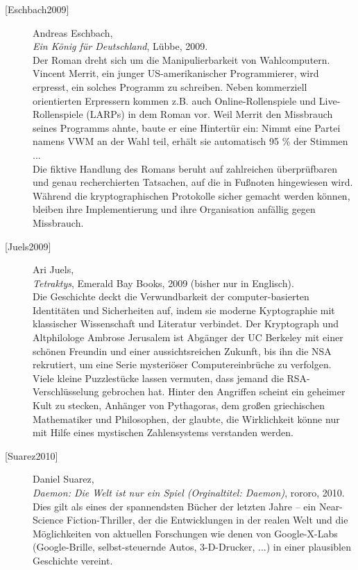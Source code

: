 \begin{refsegment}
\begin{description}
\item[\textrm{[Eschbach2009]}] 
    Andreas Eschbach,\\
    {\em Ein König für Deutschland}, Lübbe, 2009.\\
    Der Roman dreht sich um die Manipulierbarkeit von Wahlcomputern.\\
    Vincent Merrit, ein junger US-amerikanischer Programmierer, wird erpresst,
    ein solches Programm zu schreiben. Neben kommerziell orientierten Erpressern
    kommen z.B. auch Online-Rollenspiele und Live-Rollenspiele (LARPs) in dem Roman vor.
    Weil Merrit den Missbrauch seines Programms ahnte, baute er eine Hintertür
    ein: Nimmt eine Partei namens VWM an der Wahl teil, erhält sie automatisch
    95 \% der Stimmen ...\\
    Die fiktive Handlung des Romans beruht auf zahlreichen überprüfbaren und
    genau recherchierten Tatsachen, auf die in Fußnoten hingewiesen wird.\\
    Während die kryptographischen Protokolle sicher gemacht werden können,
    bleiben ihre Implementierung und ihre Organisation anfällig gegen Missbrauch.\\


\item[\textrm{[Juels2009]}] 
    Ari Juels,\\
    {\em Tetraktys}, Emerald Bay Books, 2009 (bisher nur in Englisch).\\
    Die Geschichte deckt die Verwundbarkeit der computer-basierten Identitäten und
    Sicherheiten auf, indem sie moderne Kyptographie mit klassischer Wissenschaft und
    Literatur verbindet.
    Der Kryptograph und Altphilologe Ambrose Jerusalem ist Abgänger der UC Berkeley
    mit einer schönen Freundin und einer aussichtsreichen Zukunft, bis ihn die NSA
    rekrutiert, um eine Serie mysteriöser Computereinbrüche zu verfolgen. Viele kleine
    Puzzlestücke lassen vermuten, dass jemand die RSA-Verschlüsselung gebrochen hat.
    Hinter den Angriffen scheint ein geheimer Kult zu stecken, Anhänger von Pythagoras,
    dem großen griechischen Mathematiker und Philosophen, der glaubte, die Wirklichkeit
    könne nur mit Hilfe eines mystischen Zahlensystems verstanden werden.\\


\item[\textrm{[Suarez2010]}] 
    Daniel Suarez, \\
    {\em Daemon: Die Welt ist nur ein Spiel (Orginaltitel: Daemon)}, rororo, 2010. \\
    Dies gilt als eines der spannendsten Bücher der letzten Jahre -- ein Near-Science
    Fiction-Thriller, der die Entwicklungen in der realen Welt und die Möglichkeiten von
    aktuellen Forschungen wie denen von Google-X-Labs (Google-Brille, selbst-steuernde
    Autos, 3-D-Drucker, ...) in einer plausiblen Geschichte vereint.


\end{description}
\end{refsegment}
